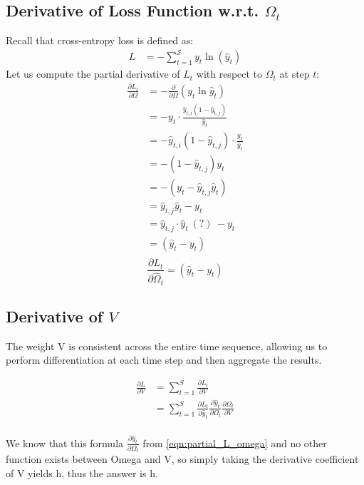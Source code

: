 \documentclass{article}
\begin{document}
\subsection{Derivative of Loss Function w.r.t. $\Omega_t$}
Recall that cross-entropy loss is defined as:
\begin{align*}
    L &=-\sum_{t=1}^{\mathcal{S}} y_{t} \ln (\hat{y}_t)
\end{align*} 
Let us compute the partial derivative of $L_t$ with respect to $\Omega_t$ at step $t$:
\begin{align*}
    \frac{\partial L_t}{\partial \Omega} & =-\frac{\partial}{\partial \Omega}( y_{t} \ln \hat{y}_t) \\
& =-y_{t} \cdot \frac{\hat{y}_{t,i}\left(1-\hat{y}_{t,j}\right)}{\hat{y}_{t}} \\
& =- \hat{y}_{t,i}\left(1-\hat{y}_{t,j}\right) \cdot \frac{y_{t}}{\hat{y}_{t}} \\
& =-\left(1-\hat{y}_{t,j}\right) y_{t} \\
& =-\left(y_{t}-\hat{y}_{t,j} \hat{y}_{t}\right) \\
& = \hat{y}_{t,j} \hat{y}_{t}- y_{t} \\
& =\hat{y}_{t,j} \cdot \hat{y}_{t}~(?)~- y_{t} \\
& = (\hat{y}_{t}-y_{t}) \\
\end{align*}
\begin{equation}
\label{eqn:partial_L_omega}
    \frac{\partial L_t}{\partial \hat{\Omega}_t} = (\hat{y}_{t}-y_{t})
\end{equation}
\subsection{Derivative of $V$}
The weight V is consistent across the entire time sequence, allowing us to perform differentiation at each time step and then aggregate the results. 

\begin{align*} 
\frac{\partial L}{\partial V} &= \sum_{t=1}^{S} \frac{\partial L_{t}}{\partial V} \\
&= \sum_{t=1}^{S} \frac{\partial L_{t}}{\partial \hat{y}_{t}} \frac{\partial \hat{y}_{t}}{\partial \Omega_{t}} \frac{\partial \Omega_{t}}{\partial V}\\
\end{align*}

We know that this formula $\frac{\partial \hat{y}_{t}}{\partial \Omega_{t}}$ from \eqref{eqn:partial_L_omega} and no other function exists between Omega and V, so simply taking the derivative coefficient of V yields h, thus the answer is h.
\end{document}
